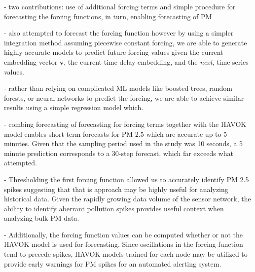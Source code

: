 - two contributions: use of additional forcing terms and simple procedure for
forecasting the forcing functions, in turn, enabling forecasting of PM

- \cite{havok-ml} also attempted to forecast the forcing function however by
using a simpler integration method assuming piecewise constant forcing, we are
able to generate highly accurate models to predict future forcing values given
the current embedding vector $\mathbf{v}$, the current time delay embedding, and
the \textit{next}, time series values.

- rather than relying on complicated ML models like boosted trees, random
forests, or neural networks to predict the forcing, we are able to achieve
similar results using a simple regression model which.

- combing forecasting of forecasting for forcing terms together with the HAVOK
model enables short-term forecasts for PM 2.5 which are accurate up to 5
minutes. Given that the sampling period used in the study was 10 seconds, a 5
minute prediction corresponds to a 30-step forecast, which far exceeds what
\cite{havok-ml} attempted.

- Thresholding the first forcing function allowed us to accurately identify PM
2.5 spikes suggesting that that is approach may be highly useful for analyzing
historical data. Given the rapidly growing data volume of the sensor network,
the ability to identify aberrant pollution spikes provides useful context when
analyzing bulk PM data.

- Additionally, the forcing function values can be computed whether or not the
HAVOK model is used for forecasting. Since oscillations in the forcing function
tend to precede spikes, HAVOK models trained for each node may be utilized to
provide early warnings for PM spikes for an automated alerting system.

